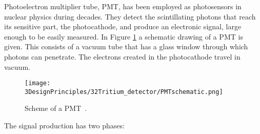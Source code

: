 Photoelectron multiplier tube, PMT, has been employed as photosensors in nuclear physics during decades. They detect the scintillating photons that reach its sensitive part, the photocathode, and produce an electronic signal, large enough to be easily measured. In Figure \ref{fig:SchemePMT} a schematic drawing of a PMT is given. This consists of a vacuum tube that has a glass window through which photons can penetrate. The electrons created in the photocathode travel in vacuum. 

\begin{figure}[htbp]
\centering
\texttt{[image: 3DesignPrinciples/32Tritium\_detector/PMTschematic.png]}
\caption{Scheme of a PMT\label{fig:SchemePMT}~\cite{Knoll}.}
\end{figure}

The signal production has two phases:
